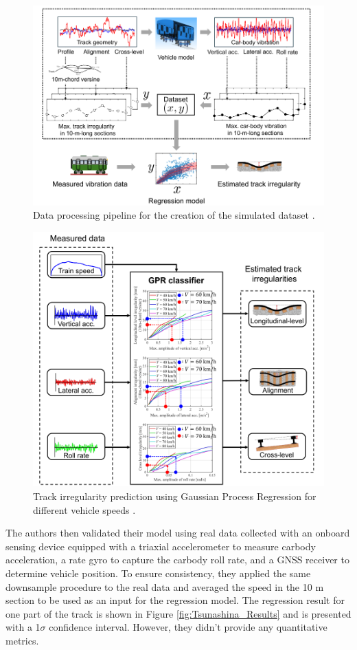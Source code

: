 \begin{figure}[H]
    \centering
    \includegraphics[width=12cm]{Cap2_LitReview/Track_Quality_Accel/Tsunashina (2024)/data-process.png}
    \caption{Data processing pipeline for the creation of the simulated dataset \cite{vibration7040049}.}
    \label{fig:Tsunashina_data_process}
\end{figure}

\begin{figure}[H]
    \centering
    \includegraphics[width=12cm]{Cap2_LitReview/Track_Quality_Accel/Tsunashina (2024)/gpr.png}
    \caption{Track irregularity prediction using Gaussian Process Regression for different vehicle speeds \cite{vibration7040049}.}
    \label{fig:Tsunashina_GPR}
\end{figure}

The authors then validated their model using real data collected with an onboard sensing device equipped with a triaxial accelerometer to measure carbody acceleration, a rate gyro to capture the carbody roll rate, and a GNSS receiver to determine vehicle position. To ensure consistency, they applied the same downsample procedure to the real data and averaged the speed in the 10 m section to be used as an input for the regression model. The regression result for one part of the track is shown in Figure \ref{fig:Tsunashina_Results} and is presented with a 1$\sigma$ confidence interval. However, they didn't provide any quantitative metrics.

